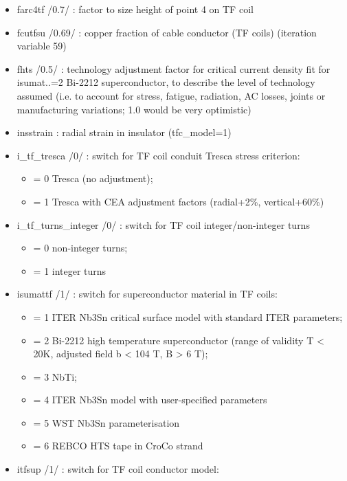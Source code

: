 \documentclass[]{article}
\providecommand{\tightlist}{%
  \setlength{\itemsep}{0pt}\setlength{\parskip}{0pt}}
\begin{document}
\begin{itemize}
\item
  farc4tf /0.7/ : factor to size height of point 4 on TF coil
\item
  fcutfsu /0.69/ : copper fraction of cable conductor (TF coils)
  (iteration variable 59)
\item
  fhts /0.5/ : technology adjustment factor for critical current density
  fit for isumat..=2 Bi-2212 superconductor, to describe the level of
  technology assumed (i.e. to account for stress, fatigue, radiation, AC
  losses, joints or manufacturing variations; 1.0 would be very
  optimistic)
\item
  insstrain : radial strain in insulator (tfc\_model=1)
\item
  i\_tf\_tresca /0/ : switch for TF coil conduit Tresca stress
  criterion:

  \begin{itemize}
  \tightlist
  \item
    = 0 Tresca (no adjustment);
  \item
    = 1 Tresca with CEA adjustment factors (radial+2\%, vertical+60\%)
  \end{itemize}
\item
  i\_tf\_turns\_integer /0/ : switch for TF coil integer/non-integer
  turns

  \begin{itemize}
  \tightlist
  \item
    = 0 non-integer turns;
  \item
    = 1 integer turns
  \end{itemize}
\item
  isumattf /1/ : switch for superconductor material in TF coils:

  \begin{itemize}
  \tightlist
  \item
    = 1 ITER Nb3Sn critical surface model with standard ITER parameters;
  \item
    = 2 Bi-2212 high temperature superconductor (range of validity T
    \textless{} 20K, adjusted field b \textless{} 104 T, B
    \textgreater{} 6 T);
  \item
    = 3 NbTi;
  \item
    = 4 ITER Nb3Sn model with user-specified parameters
  \item
    = 5 WST Nb3Sn parameterisation
  \item
    = 6 REBCO HTS tape in CroCo strand
  \end{itemize}
\item
  itfsup /1/ : switch for TF coil conductor model:


\end{itemize}
\end{document}
